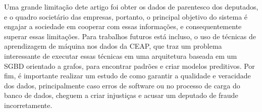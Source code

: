 \documentclass[12pt]{article}
\begin{document}
Uma grande limitação dete artigo foi obter os dados de parentesco dos deputados, e o quadro societário das empresas, portanto, o principal objetivo do sistema é engajar a sociedade em cooperar com essas informações, e consequentemente superar essas limitações. Para trabalhos futuros está incluso, o uso de técnicas de aprendizagem de máquina nos dados da CEAP, que traz um problema interessante de executar essas técnicas em uma arquitetura baseada em um SGBD orientado a grafos, para encontrar padrões e criar modelos preditivos. Por fim, é importante realizar um estudo de como garantir a qualidade e veracidade dos dados, principalmente caso erros de software ou no processo de carga do banco de dados, cheguem a criar injustiças e acusar um deputado de fraude incorretamente.



\end{document}

